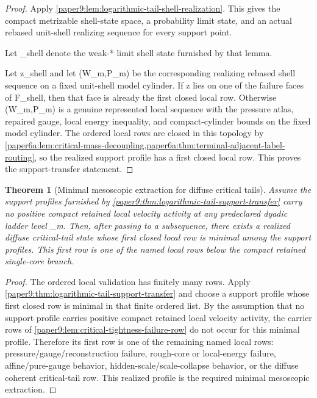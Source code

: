 \documentclass[11pt]{amsart}
\def\({}%
\def\){}%
\def\mathfrak#1{#1}%
\theoremstyle{plain}
\newtheorem{theorem}{Theorem}[section]
\theoremstyle{definition}
\theoremstyle{remark}
\begin{document}
\begin{proof}
Apply \cref{paper9:lem:logarithmic-tail-shell-realization}.  This gives the
compact metrizable shell-state space, a probability limit state, and an actual
rebased unit-shell realizing sequence for every support point.

Let \(\Pi_{\rm shell}\) denote the weak-* limit shell state furnished by that
lemma.

Let \(\mathfrak z\in{}\Pi_{\rm shell}\) and let
\((W_m,\widetilde P_m)\) be the corresponding realizing rebased shell sequence on a fixed
unit-shell model cylinder.  If \(\mathfrak z\) lies on one of the failure faces
of \(\mathfrak F_{\rm shell}\), then that face is already the first closed local
row.  Otherwise \((W_m,\widetilde P_m)\) is a genuine represented local sequence with the
pressure atlas, repaired gauge, local energy inequality, and compact-cylinder
bounds on the fixed model cylinder.  The ordered local rows are closed in this
topology by
\cref{paper6a:lem:critical-mass-decoupling,paper6a:thm:terminal-adjacent-label-routing},
so the realized support profile has a first closed local row.  This proves the
support-transfer statement.
\end{proof}

\begin{theorem}[Minimal mesoscopic extraction for diffuse critical tails]
\label{paper9:thm:minimal-mesoscopic-extraction}
Assume the support profiles furnished by
\cref{paper9:thm:logarithmic-tail-support-transfer} carry no positive compact
retained local velocity activity at any predeclared dyadic ladder level
\(\eta_m\).  Then, after passing to a
subsequence, there exists a realized diffuse critical-tail state whose first
closed local row is minimal among the support profiles.  This first row is one
of the named local rows below the compact retained single-core branch.
\end{theorem}

\begin{proof}
The ordered local validation has finitely many rows.  Apply
\cref{paper9:thm:logarithmic-tail-support-transfer} and choose a support
profile whose first closed row is minimal in that finite ordered list.  By the
assumption that no support profile carries positive compact retained local
velocity activity, the carrier rows of
\cref{paper9:lem:critical-tightness-failure-row} do not occur for this minimal
profile.  Therefore its first row is one of the remaining named local rows:
pressure/gauge/reconstruction failure, rough-core or local-energy failure,
affine/pure-gauge behavior, hidden-scale/scale-collapse behavior, or the
diffuse coherent critical-tail row.  This realized profile is the required
minimal mesoscopic extraction.
\end{proof}
\end{document}
